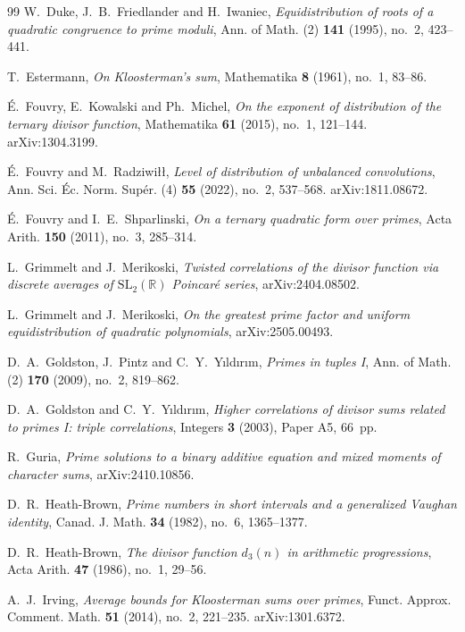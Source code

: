 \documentclass[11pt]{amsart}
\theoremstyle{definition}
\theoremstyle{remark}
\numberwithin{equation}{section}
\begin{document}
\begin{thebibliography}{99}
W.~Duke, J.~B.~Friedlander and H.~Iwaniec,
\emph{Equidistribution of roots of a quadratic congruence to prime moduli},
Ann. of Math. (2) \textbf{141} (1995), no.~2, 423--441.

T.~Estermann,
\emph{On Kloosterman's sum},
Mathematika \textbf{8} (1961), no.~1, 83--86.

\'E.~Fouvry, E.~Kowalski and Ph.~Michel,
\emph{On the exponent of distribution of the ternary divisor function},
Mathematika \textbf{61} (2015), no.~1, 121--144.
arXiv:1304.3199.

\'E.~Fouvry and M.~Radziwi\l\l,
\emph{Level of distribution of unbalanced convolutions},
Ann. Sci. \'Ec. Norm. Sup\'er. (4) \textbf{55} (2022), no.~2, 537--568.
arXiv:1811.08672.

\'E.~Fouvry and I.~E.~Shparlinski,
\emph{On a ternary quadratic form over primes},
Acta Arith. \textbf{150} (2011), no.~3, 285--314.

L.~Grimmelt and J.~Merikoski,
\emph{Twisted correlations of the divisor function via discrete averages of
$\mathrm{SL}_2(\mathbb R)$ Poincar\'e series},
arXiv:2404.08502.

L.~Grimmelt and J.~Merikoski,
\emph{On the greatest prime factor and uniform equidistribution of quadratic
polynomials},
arXiv:2505.00493.

D.~A.~Goldston, J.~Pintz and C.~Y.~Y\i ld\i r\i m,
\emph{Primes in tuples I},
Ann. of Math. (2) \textbf{170} (2009), no.~2, 819--862.

D.~A.~Goldston and C.~Y.~Y\i ld\i r\i m,
\emph{Higher correlations of divisor sums related to primes I: triple
correlations},
Integers \textbf{3} (2003), Paper A5, 66~pp.

R.~Guria,
\emph{Prime solutions to a binary additive equation and mixed moments of
character sums},
arXiv:2410.10856.

D.~R.~Heath-Brown,
\emph{Prime numbers in short intervals and a generalized Vaughan identity},
Canad. J. Math. \textbf{34} (1982), no.~6, 1365--1377.

D.~R.~Heath-Brown,
\emph{The divisor function $d_3(n)$ in arithmetic progressions},
Acta Arith. \textbf{47} (1986), no.~1, 29--56.

A.~J.~Irving,
\emph{Average bounds for Kloosterman sums over primes},
Funct. Approx. Comment. Math. \textbf{51} (2014), no.~2, 221--235.
arXiv:1301.6372.


\end{thebibliography}
\end{document}
